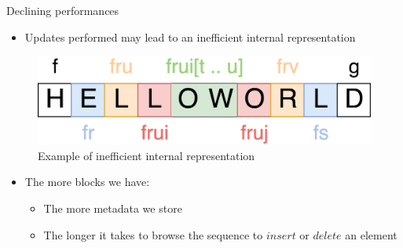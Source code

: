 \documentclass[10pt]{beamer}
\begin{document}
\begin{frame}{Declining performances}
  \begin{itemize}
    \item Updates performed may lead to an inefficient internal representation
  \end{itemize}
  \begin{figure}
    \includegraphics[scale=0.15]{img/worst-case.png}
    \caption{Example of inefficient internal representation}
  \end{figure}
  \begin{itemize}
    \item The more blocks we have:
    \begin{itemize}
      \item The more metadata we store
      \item The longer it takes to browse the sequence to $insert$ or $delete$ an element
    \end{itemize}
  \end{itemize}

\end{frame}
\end{document}
